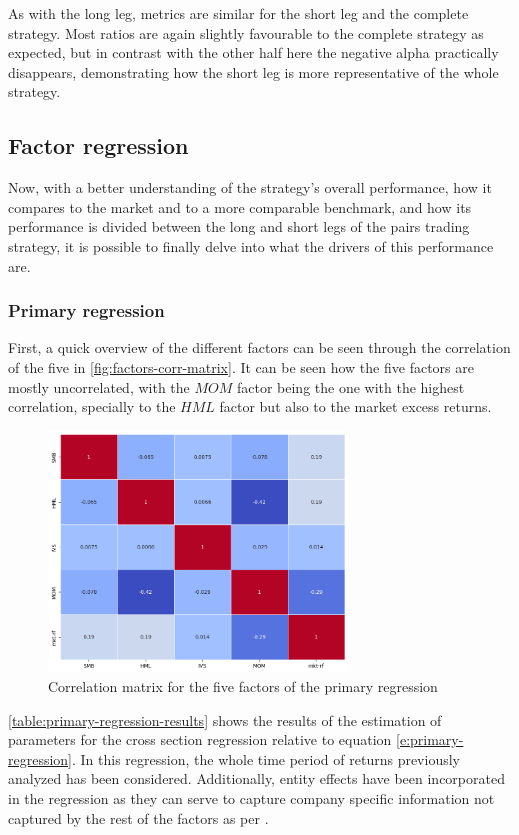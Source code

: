 As with the long leg, metrics are similar for the short leg and the complete strategy. Most ratios are again slightly favourable to the complete strategy as expected, but in contrast with the other half here the negative alpha practically disappears, demonstrating how the short leg is more representative of the whole strategy. 


\subsection{Factor regression}
Now, with a better understanding of the strategy's overall performance, how it compares to the market and to a more comparable benchmark, and how its performance is divided between the long and short legs of the pairs trading strategy, it is possible to finally delve into what the drivers of this performance are. 

\subsubsection{Primary regression}

First, a quick overview of the different factors can be seen through the correlation of the five in \autoref{fig:factors-corr-matrix}. It can be seen how the five factors are mostly uncorrelated, with the $MOM$ factor being the one with the highest correlation, specially to the $HML$ factor but also to the market excess returns. 
\newpage
\begin{figure}[ht]
    \centering
    \includegraphics[width=300px]{assets/factors-corr-matrix.png}
    \caption{Correlation matrix for the five factors of the primary regression}
    \label{fig:factors-corr-matrix}
\end{figure}

\autoref{table:primary-regression-results} shows the results of the estimation of parameters for the cross section regression relative to equation \eqref{e:primary-regression}. In this regression, the whole time period of returns previously analyzed has been considered. Additionally, entity effects have been incorporated in the regression as they can serve to capture company specific information not captured by the rest of the factors as per \cite{ian_wagner_2019}. 

